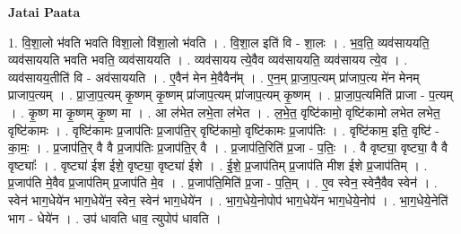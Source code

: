 \documentclass[17pt]{extarticle}
\begin{document}
\textbf{Jatai Paata} \newline

1. वि॒शा॒लो भ॑वति भवति विशा॒लो वि॑शा॒लो भ॑वति । . वि॒शा॒ल इति॑ वि - शा॒लः । . भ॒व॒ति॒ व्यव॑साययति॒ व्यव॑साययति भवति भवति॒ व्यव॑साययति । . व्यव॑सायय त्ये॒वैव व्यव॑साययति॒ व्यव॑सायय त्ये॒व । . व्यव॑सायय॒तीति॑ वि - अव॑साययति । . ए॒वैन॑ मेन मे॒वैवैन᳚म् । . ए॒न॒म् प्रा॒जा॒प॒त्यम् प्रा॑जाप॒त्य मे॑न मेनम् प्राजाप॒त्यम् । . प्रा॒जा॒प॒त्यम् कृ॒ष्णम् कृ॒ष्णम् प्रा॑जाप॒त्यम् प्रा॑जाप॒त्यम् कृ॒ष्णम् । . प्रा॒जा॒प॒त्यमिति॑ प्राजा - प॒त्यम् । . कृ॒ष्ण मा कृ॒ष्णम् कृ॒ष्ण मा । . आ ल॑भेत लभे॒ता ल॑भेत । . ल॒भे॒त॒ वृष्टि॑कामो॒ वृष्टि॑कामो लभेत लभेत॒ वृष्टि॑कामः । . वृष्टि॑कामः प्र॒जाप॑तिः प्र॒जाप॑ति॒र् वृष्टि॑कामो॒ वृष्टि॑कामः प्र॒जाप॑तिः । . वृष्टि॑काम॒ इति॒ वृष्टि॑ - का॒मः॒ । . प्र॒जाप॑ति॒र् वै वै प्र॒जाप॑तिः प्र॒जाप॑ति॒र् वै । . प्र॒जाप॑ति॒रिति॑ प्र॒जा - प॒तिः॒ । . वै वृष्ट्या॒ वृष्ट्या॒ वै वै वृष्ट्याः᳚ । . वृष्ट्या॑ ईश ईशे॒ वृष्ट्या॒ वृष्ट्या॑ ईशे । . ई॒शे॒ प्र॒जाप॑तिम् प्र॒जाप॑ति मीश ईशे प्र॒जाप॑तिम् । . प्र॒जाप॑ति मे॒वैव प्र॒जाप॑तिम् प्र॒जाप॑ति मे॒व । . प्र॒जाप॑ति॒मिति॑ प्र॒जा - प॒ति॒म् । . ए॒व स्वेन॒ स्वेनै॒वैव स्वेन॑ । . स्वेन॑ भाग॒धेये॑न भाग॒धेये॑न॒ स्वेन॒ स्वेन॑ भाग॒धेये॑न । . भा॒ग॒धेये॒नोपोप॑ भाग॒धेये॑न भाग॒धेये॒नोप॑ । . भा॒ग॒धेये॒नेति॑ भाग - धेये॑न । . उप॑ धावति धाव॒ त्युपोप॑ धावति । \newline
\end{document}
